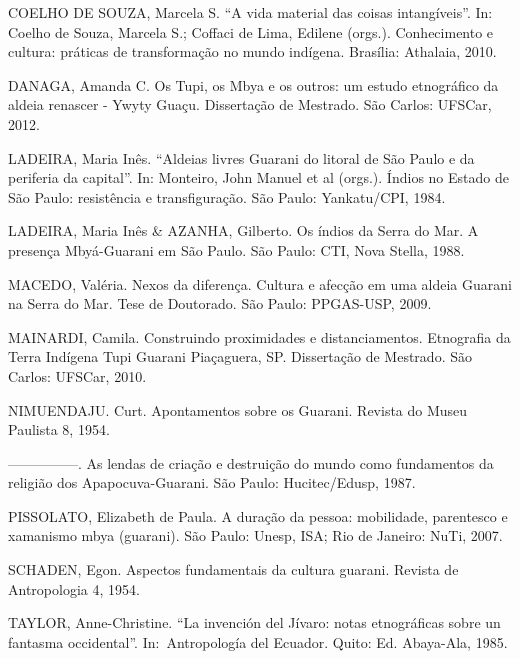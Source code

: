 \documentclass{article}
\begin{document}
COELHO DE SOUZA, Marcela S. {\textquotedblleft}A vida material das
coisas intang\'iveis{\textquotedblright}. In: Coelho de Souza, Marcela
S.; Coffaci de Lima, Edilene (orgs.). Conhecimento e cultura:
pr\'aticas de transforma\c{c}\~ao no mundo ind\'igena. Bras\'ilia:
Athalaia, 2010.

DANAGA, Amanda C. Os Tupi, os Mbya e os outros: um estudo etnogr\'afico
da aldeia renascer - Ywyty Gua\c{c}u. Disserta\c{c}\~ao de Mestrado.
S\~ao Carlos: UFSCar, 2012. 

LADEIRA, Maria In\^es. {\textquotedblleft}Aldeias livres Guarani do
litoral de S\~ao Paulo e da periferia da capital{\textquotedblright}.
In: Monteiro, John Manuel et al (orgs.). \'Indios no Estado de S\~ao
Paulo: resist\^encia e transfigura\c{c}\~ao. S\~ao Paulo: Yankatu/CPI,
1984.

LADEIRA, Maria In\^es \& AZANHA, Gilberto. Os \'indios da Serra do Mar.
A presen\c{c}a Mby\'a-Guarani em S\~ao Paulo. S\~ao Paulo: CTI, Nova
Stella, 1988.

MACEDO, Val\'eria. Nexos da diferen\c{c}a. Cultura e afec\c{c}\~ao em
uma aldeia Guarani na Serra do Mar. Tese de Doutorado.  S\~ao Paulo:
PPGAS-USP, 2009.

MAINARDI, Camila. Construindo proximidades e distanciamentos. Etnografia
da Terra Ind\'igena Tupi Guarani Pia\c{c}aguera, SP. Disserta\c{c}\~ao
de Mestrado. S\~ao Carlos: UFSCar, 2010.

NIMUENDAJU. Curt. Apontamentos sobre os Guarani. Revista do Museu
Paulista 8, 1954.

{}---{}---{}---{}---{}---. As lendas de cria\c{c}\~ao e destrui\c{c}\~ao
do mundo como fundamentos da religi\~ao dos Apapocuva-Guarani. S\~ao
Paulo: Hucitec/Edusp, 1987.

PISSOLATO, Elizabeth de Paula. A dura\c{c}\~ao da pessoa: mobilidade,
parentesco e xamanismo mbya (guarani). S\~ao Paulo: Unesp, ISA; Rio de
Janeiro: NuTi, 2007.

SCHADEN, Egon. Aspectos fundamentais da cultura guarani. Revista de
Antropologia 4, 1954.

TAYLOR, Anne-Christine. {\textquotedblleft}La invenci\'on del J\'ivaro:
notas etnogr\'aficas sobre un fantasma occidental{\textquotedblright}.
In:~Antropolog\'ia del Ecuador. Quito: Ed. Abaya-Ala, 1985.
\end{document}
